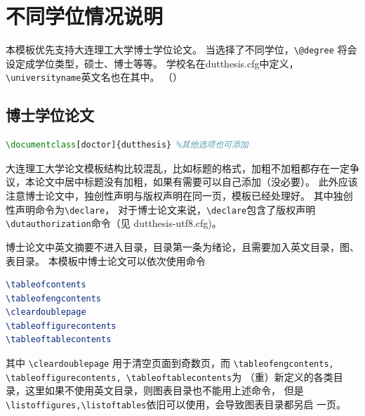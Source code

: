 \chapter{不同学位情况说明}
本模板优先支持大连理工大学博士学位论文。
当选择了不同学位，\verb|\@degree| 将会设定成学位类型，硕士、博士等等。
学校名在dutthesis.cfg中定义，\verb|\universityname|英文名也在其中。
（\universityname\makeatletter\@degree\makeatother）
\section{博士学位论文}
\begin{lstlisting}[language=TeX]
    \documentclass[doctor]{dutthesis} %其他选项也可添加
\end{lstlisting}

大连理工大学论文模板结构比较混乱，比如标题的格式，加粗不加粗都存在一定争议，本论文中居中标题没有加粗，如果有需要可以自己添加（没必要）。
此外应该注意博士论文中，独创性声明与版权声明在同一页，模板已经处理好。
其中独创性声明命令为\verb|\declare|，
对于博士论文来说，\verb|\declare|包含了版权声明\verb|\dutauthorization|命令（见
dutthesis-utf8.cfg)。

博士论文中英文摘要不进入目录，目录第一条为绪论，且需要加入英文目录，图、表目录。
本模板中博士论文可以依次使用命令
\begin{lstlisting}[language=TeX]
\tableofcontents
\tableofengcontents
\cleardoublepage
\tableoffigurecontents
\tableoftablecontents
\end{lstlisting}
其中 \lstinline|\cleardoublepage| 用于清空页面到奇数页，而
\lstinline|\tableofengcontents, \tableoffigurecontents, \tableoftablecontents|为
（重）新定义的各类目录，这里如果不使用英文目录，则图表目录也不能用上述命令，
但是 \lstinline|\listoffigures,\listoftables|依旧可以使用，会导致图表目录都另启
一页。

